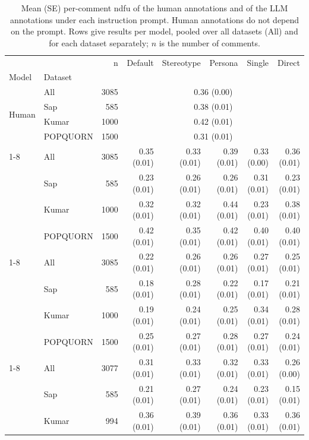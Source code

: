 \begin{table}[t]
\small
\centering
\caption{Mean (SE) per-comment \ac{ndfu} of the human annotations and of the LLM annotations under each instruction prompt. Human annotations do not depend on the prompt. Rows give results per model, pooled over all datasets (All) and for each dataset separately; $n$ is the number of comments.}
\label{tab:mean-ndfu-by-prompt-excluding}
\begin{tabular}{llrrrrrr}
\toprule
 &  & n & Default & Stereotype & Persona & Single & Direct \\
Model & Dataset &  &  &  &  &  &  \\
\midrule
\multirow[t]{4}{*}{Human} & All & 3085 & \multicolumn{5}{c}{0.36 (0.00)} \\
 & Sap & 585 & \multicolumn{5}{c}{0.38 (0.01)} \\
 & Kumar & 1000 & \multicolumn{5}{c}{0.42 (0.01)} \\
 & POPQUORN & 1500 & \multicolumn{5}{c}{0.31 (0.01)} \\
\cline{1-8}
\multirow[t]{4}{*}{OLMo 32B} & All & 3085 & 0.35 (0.01) & 0.33 (0.01) & 0.39 (0.01) & 0.33 (0.00) & 0.36 (0.01) \\
 & Sap & 585 & 0.23 (0.01) & 0.26 (0.01) & 0.26 (0.01) & 0.31 (0.01) & 0.23 (0.01) \\
 & Kumar & 1000 & 0.32 (0.01) & 0.32 (0.01) & 0.44 (0.01) & 0.23 (0.01) & 0.38 (0.01) \\
 & POPQUORN & 1500 & 0.42 (0.01) & 0.35 (0.01) & 0.42 (0.01) & 0.40 (0.01) & 0.40 (0.01) \\
\cline{1-8}
\multirow[t]{4}{*}{Qwen 32B} & All & 3085 & 0.22 (0.01) & 0.26 (0.01) & 0.26 (0.01) & 0.27 (0.01) & 0.25 (0.01) \\
 & Sap & 585 & 0.18 (0.01) & 0.28 (0.01) & 0.22 (0.01) & 0.17 (0.01) & 0.21 (0.01) \\
 & Kumar & 1000 & 0.19 (0.01) & 0.24 (0.01) & 0.25 (0.01) & 0.34 (0.01) & 0.28 (0.01) \\
 & POPQUORN & 1500 & 0.25 (0.01) & 0.27 (0.01) & 0.28 (0.01) & 0.27 (0.01) & 0.24 (0.01) \\
\cline{1-8}
\multirow[t]{4}{*}{Mistral 7B} & All & 3077 & 0.31 (0.01) & 0.33 (0.01) & 0.32 (0.01) & 0.33 (0.01) & 0.26 (0.00) \\
 & Sap & 585 & 0.21 (0.01) & 0.27 (0.01) & 0.24 (0.01) & 0.23 (0.01) & 0.15 (0.01) \\
 & Kumar & 994 & 0.36 (0.01) & 0.39 (0.01) & 0.36 (0.01) & 0.33 (0.01) & 0.36 (0.01) \\

\end{tabular}
\end{table}

